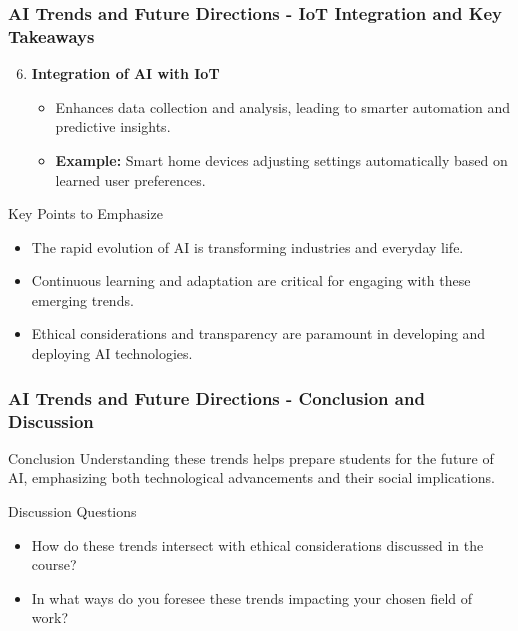\documentclass[aspectratio=169]{beamer}
\begin{document}
\begin{frame}[fragile]
    \frametitle{AI Trends and Future Directions - IoT Integration and Key Takeaways}
    \begin{enumerate}
        \setcounter{enumi}{5}
        \item \textbf{Integration of AI with IoT}  
        \begin{itemize}
            \item Enhances data collection and analysis, leading to smarter automation and predictive insights.
            \item \textbf{Example:} Smart home devices adjusting settings automatically based on learned user preferences.
        \end{itemize}
    \end{enumerate}

    \begin{block}{Key Points to Emphasize}
        \begin{itemize}
            \item The rapid evolution of AI is transforming industries and everyday life.
            \item Continuous learning and adaptation are critical for engaging with these emerging trends.
            \item Ethical considerations and transparency are paramount in developing and deploying AI technologies.
        \end{itemize}
    \end{block}
\end{frame}

\begin{frame}[fragile]
    \frametitle{AI Trends and Future Directions - Conclusion and Discussion}
    \begin{block}{Conclusion}
        Understanding these trends helps prepare students for the future of AI, emphasizing both technological advancements and their social implications.
    \end{block}

    \begin{block}{Discussion Questions}
        \begin{itemize}
            \item How do these trends intersect with ethical considerations discussed in the course?
            \item In what ways do you foresee these trends impacting your chosen field of work?
        \end{itemize}
    \end{block}
\end{frame}
\end{document}
